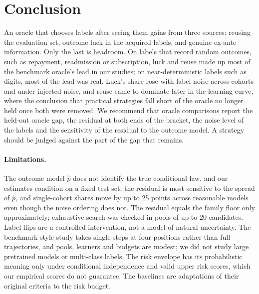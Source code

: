 \documentclass[runningheads]{llncs}
\begin{document}
\section{Conclusion}
\label{sec:conclusion}
An oracle that chooses labels after seeing them gains from three sources: reusing the evaluation set, outcome luck in the acquired labels, and genuine ex-ante information. Only the last is headroom. On labels that record random outcomes, such as repayment, readmission or subscription, luck and reuse made up most of the benchmark oracle's lead in our studies; on near-deterministic labels such as digits, most of the lead was real. Luck's share rose with label noise across cohorts and under injected noise, and reuse came to dominate later in the learning curve, where the conclusion that practical strategies fall short of the oracle no longer held once both were removed. We recommend that oracle comparisons report the held-out oracle gap, the residual at both ends of the bracket, the noise level of the labels and the sensitivity of the residual to the outcome model. A strategy should be judged against the part of the gap that remains.

\paragraph{Limitations.} The outcome model $\hat p$ does not identify the true conditional law, and our estimates condition on a fixed test set; the residual is most sensitive to the spread of $\hat p$, and single-cohort shares move by up to 25 points across reasonable models even though the noise ordering does not. The residual equals the family floor only approximately; exhaustive search was checked in pools of up to 20 candidates. Label flips are a controlled intervention, not a model of natural uncertainty. The benchmark-style study takes single steps at four positions rather than full trajectories, and pools, learners and budgets are modest; we did not study large pretrained models or multi-class labels. The risk envelope has its probabilistic meaning only under conditional independence and valid upper risk scores, which our empirical scores do not guarantee. The baselines are adaptations of their original criteria to the risk budget.



\end{document}
